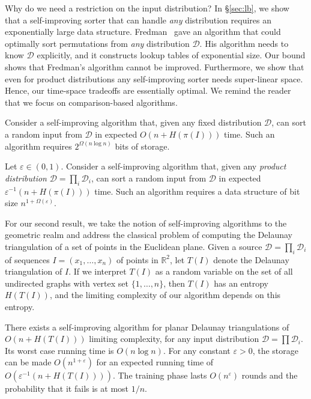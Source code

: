 \documentclass{siamltex}
\newcommand{\D}{\mathcal{D}}
\newcommand{\R}{\mathbb R}
\newcommand{\eps}{\varepsilon}
\begin{document}
Why do we need a restriction on the input distribution?
In \S\ref{sec:lb}, we show that a self-improving sorter 
that can handle \emph{any} distribution requires an exponentially
large data structure. 
Fredman~\cite{Fredman76}
gave an algorithm that could optimally sort permutations from \emph{any} 
distribution $\D$. His algorithm needs to know $\D$ 
explicitly, and it constructs lookup tables of exponential size. 
Our bound shows that Fredman's algorithm cannot 
be improved.
Furthermore, we show that even for product distributions any
self-improving sorter needs super-linear space. Hence, our time-space
tradeoffs are essentially optimal. We remind the reader that we
focus on comparison-based algorithms.
\medskip
\begin{theorem} \label{thm:sort-lb} 
Consider a self-improving algorithm that, given any 
fixed distribution $\D$, can sort a random input from $\D$ in
expected $O(n + H(\pi(I)))$ time.
Such an algorithm requires $2^{\Omega(n\log n)}$ bits of storage.

Let $\eps \in (0,1)$.
Consider a self-improving algorithm that,
given any \emph{product distribution} $\D= \prod_i \D_i$,
can sort a random input from $\D$ in expected $\eps^{-1}(n + H(\pi(I)))$ time.
Such an algorithm requires a data structure 
of bit size $n^{1+\Omega(\eps)}$.
\end{theorem}
\medskip

For our second result, we take the notion of self-improving algorithms
to the geometric realm and address the classical
problem of computing the Delaunay triangulation
of a set of points in the Euclidean plane.
Given a source $\D = \prod_i \D_i$ of sequences 
$I = (x_1,\ldots,x_n)$ of points in $\R^2$,
let $T(I)$ denote the Delaunay triangulation of $I$.
If we interpret $T(I)$ as a random variable on the set of 
all undirected graphs with vertex set $\{1, \ldots, n\}$,
then $T(I)$ has an entropy $H(T(I))$, and
the limiting complexity of our algorithm depends on this entropy.
\medskip
\begin{theorem} \label{thm:del}
There exists a self-improving algorithm for planar Delaunay triangulations
of $O(n + H(T(I)))$ limiting complexity, for any input distribution 
$\D = \prod \D_i$. 
Its worst case running time is $O(n \log n)$.
For any constant $\eps > 0$, the storage can be made $O(n^{1+\eps})$ for
an expected running time of $O(\eps^{-1}(n + H(T(I))))$.
The training phase lasts $O(n^\eps)$ rounds and the probability
that it fails is at most $1/n$.
\end{theorem}
\medskip
\end{document}
